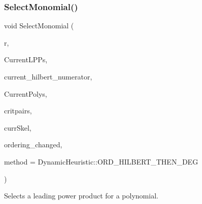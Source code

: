 \subsubsection{\texorpdfstring{Select\+Monomial()}{SelectMonomial()}}
{\footnotesize\ttfamily void Select\+Monomial (\begin{DoxyParamCaption}\item[{\hyperlink{group__polygroup_class_abstract___polynomial}{Abstract\+\_\+\+Polynomial} $\ast$}]{r,  }\item[{list$<$ \hyperlink{group__polygroup_class_monomial}{Monomial} $>$ \&}]{Current\+L\+P\+Ps,  }\item[{\hyperlink{group__polygroup_class_dense___univariate___integer___polynomial}{Dense\+\_\+\+Univariate\+\_\+\+Integer\+\_\+\+Polynomial} $\ast$$\ast$}]{current\+\_\+hilbert\+\_\+numerator,  }\item[{const list$<$ \hyperlink{group__polygroup_class_abstract___polynomial}{Abstract\+\_\+\+Polynomial} $\ast$$>$ \&}]{Current\+Polys,  }\item[{const list$<$ \hyperlink{group___g_b_computation_class_critical___pair___dynamic}{Critical\+\_\+\+Pair\+\_\+\+Dynamic} $\ast$$>$ \&}]{critpairs,  }\item[{\hyperlink{group___c_l_s_solvers_class_l_p___solver}{L\+P\+\_\+\+Solver} $\ast$}]{curr\+Skel,  }\item[{bool \&}]{ordering\+\_\+changed,  }\item[{\hyperlink{group___g_b_computation_ga498e6d10e581ed9dca25264cbe825ce0}{Dynamic\+Heuristic}}]{method = {\ttfamily DynamicHeuristic\+:\+:ORD\+\_\+HILBERT\+\_\+THEN\+\_\+DEG} }\end{DoxyParamCaption})}



Selects a leading power product for a polynomial. 

